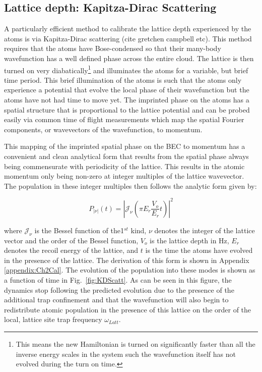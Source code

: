 \subsection{Lattice depth: Kapitza-Dirac Scattering}

A particularly efficient method to calibrate the lattice depth experienced by the atoms is via Kapitza-Dirac scattering (cite gretchen campbell etc). This method requires that the atoms have Bose-condensed so that their many-body wavefunction has a well defined phase across the entire cloud. The lattice is then turned on very diabatically\footnote{This means the new Hamiltonian is turned on significantly faster than all the inverse energy scales in the system such the wavefunction itself has not evolved during the turn on time.} and illuminates the atoms for a variable, but brief time period. This brief illumination of the atoms is such that the atoms only experience a potential that evolve the local phase of their wavefunction but the atoms have not had time to move yet. The imprinted phase on the atoms has a spatial structure that is proportional to the lattice potential and can be probed easily via common time of flight measurements which map the spatial Fourier components, or wavevectors of the wavefunction, to momentum. 

This mapping of the imprinted spatial phase on the BEC to momentum has a convenient and clean analytical form that results from the spatial phase always being commensurate with periodicity of the lattice. This results in the atomic momentum only being non-zero at integer multiples of the lattice wavevector. The population in these integer multiples then follows the analytic form given by:

\begin{equation}
\label{eqn:KDanalytic}
P_{|\nu|}(t)= \left | \mathcal{J}_\nu \left ( \pi E_r \frac{V_o}{E_r} t \right ) \right |^2
\end{equation}

where $\mathcal{J}_\nu$ is the Bessel function of the1$^{st}$ kind, $\nu$ denotes the integer of the lattice vector and the order of the Bessel function, $V_o$ is the lattice depth in Hz, $E_r$ denotes the recoil energy of the lattice, and $t$ is the time the atoms have evolved in the presence of the lattice. The derivation of this form is shown in Appendix \ref{appendix:Ch2Cal}. The evolution of the population into these modes is shown as a function of time in Fig.~\ref{fig:KDScatt}. As can be seen in this figure, the dynamics stop following the predicted evolution due to the presence of the additional trap confinement and that the wavefunction will also begin to redistribute atomic population in the presence of this lattice on the order of the local, lattice site trap frequency $\omega_{Latt}$.

